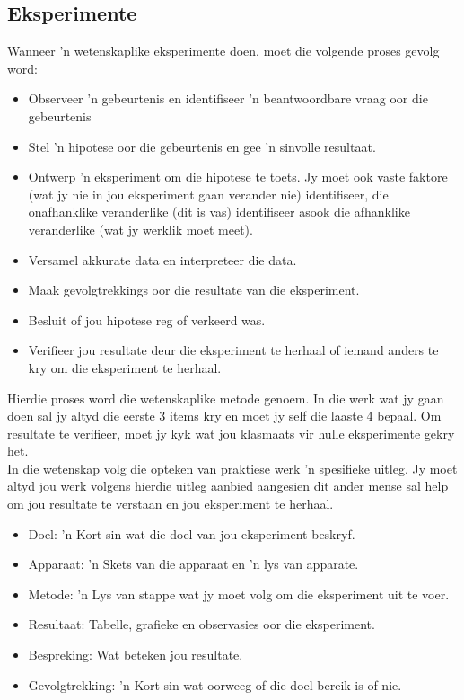 \subsection*{Eksperimente}
Wanneer  'n wetenskaplike eksperimente doen, moet die volgende proses gevolg word:
\begin{itemize}
\item Observeer  'n gebeurtenis en identifiseer  'n beantwoordbare vraag oor die gebeurtenis
\item Stel  'n hipotese oor die gebeurtenis en gee  'n sinvolle resultaat.
\item Ontwerp  'n eksperiment om die hipotese te toets. Jy moet ook vaste faktore (wat jy nie in jou eksperiment gaan verander nie) identifiseer, die onafhanklike veranderlike (dit is vas) identifiseer asook die afhanklike veranderlike (wat jy werklik moet meet).
\item Versamel akkurate data en interpreteer die data.
\item Maak gevolgtrekkings oor die resultate van die eksperiment.
\item Besluit of jou hipotese reg of verkeerd was.
\item Verifieer jou resultate deur die eksperiment te herhaal of iemand anders te kry om die eksperiment te herhaal.
\end{itemize}
Hierdie proses word die wetenskaplike metode genoem. In die werk wat jy gaan doen sal jy altyd die eerste 3 items kry en moet jy self die laaste 4 bepaal. Om resultate te verifieer, moet jy kyk wat jou klasmaats vir hulle eksperimente gekry het. \\
In die wetenskap volg die opteken van praktiese werk  'n spesifieke uitleg. Jy moet altyd jou werk volgens hierdie uitleg aanbied aangesien dit ander mense sal help om jou resultate te verstaan en jou eksperiment te herhaal.
\begin{itemize}
\item Doel:  'n Kort sin wat die doel van jou eksperiment beskryf.
\item Apparaat:  'n Skets van die apparaat en  'n lys van apparate.
\item Metode:  'n Lys van stappe wat jy  moet volg om die eksperiment uit te voer.
\item Resultaat: Tabelle, grafieke en observasies oor die eksperiment.
\item Bespreking: Wat beteken jou resultate.
\item Gevolgtrekking:  'n Kort sin wat oorweeg of die doel bereik is of nie.
\end{itemize}
